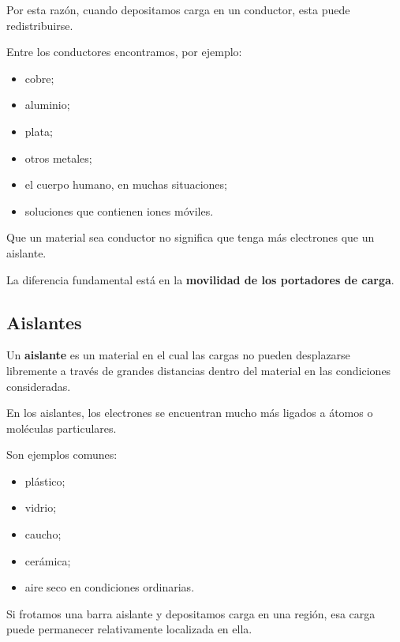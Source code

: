 Por esta razón, cuando depositamos carga en un conductor, esta puede
redistribuirse.

Entre los conductores encontramos, por ejemplo:

\begin{itemize}
    \item cobre;
    \item aluminio;
    \item plata;
    \item otros metales;
    \item el cuerpo humano, en muchas situaciones;
    \item soluciones que contienen iones móviles.
\end{itemize}

\begin{idea}
Que un material sea conductor no significa que tenga más electrones que un
aislante.

La diferencia fundamental está en la
\textbf{movilidad de los portadores de carga}.
\end{idea}



\subsection{Aislantes}

\begin{definicion}
Un \textbf{aislante} es un material en el cual las cargas no pueden
desplazarse libremente a través de grandes distancias dentro del material en
las condiciones consideradas.
\end{definicion}

En los aislantes, los electrones se encuentran mucho más ligados a átomos o
moléculas particulares.

Son ejemplos comunes:

\begin{itemize}
    \item plástico;
    \item vidrio;
    \item caucho;
    \item cerámica;
    \item aire seco en condiciones ordinarias.
\end{itemize}

Si frotamos una barra aislante y depositamos carga en una región, esa carga
puede permanecer relativamente localizada en ella.

